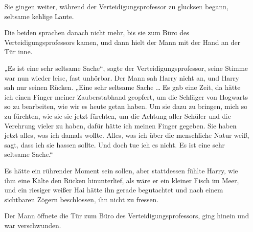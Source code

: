 Sie gingen weiter, während der Verteidigungsprofessor zu glucksen begann, seltsame kehlige Laute.

Die beiden sprachen danach nicht mehr, bis sie zum Büro des Verteidigungsprofessors kamen, und dann hielt der Mann mit der Hand an der Tür inne.

„Es ist eine sehr seltsame Sache“, sagte der Verteidigungsprofessor, seine Stimme war nun wieder leise, fast unhörbar. Der Mann sah Harry nicht an, und Harry sah nur seinen Rücken.
„Eine sehr seltsame Sache … Es gab eine Zeit, da hätte ich einen Finger meiner Zauberstabhand geopfert, um die Schläger von Hogwarts so zu bearbeiten, wie wir es heute getan haben. Um sie dazu zu bringen, mich so zu fürchten, wie sie sie jetzt fürchten, um die Achtung aller Schüler und die Verehrung vieler zu haben, dafür hätte ich meinen Finger gegeben. Sie haben jetzt alles, was ich damals wollte. Alles, was ich über die menschliche Natur weiß, sagt, dass ich sie hassen sollte. Und doch tue ich es nicht. Es ist eine sehr seltsame Sache.“

Es hätte ein rührender Moment sein sollen, aber stattdessen fühlte Harry, wie ihm eine Kälte den Rücken hinunterlief, als wäre er ein kleiner Fisch im Meer, und ein riesiger weißer Hai hätte ihn gerade begutachtet und nach einem sichtbaren Zögern beschlossen, ihn nicht zu fressen.

Der Mann öffnete die Tür zum Büro des Verteidigungsprofessors, ging hinein und war verschwunden.

